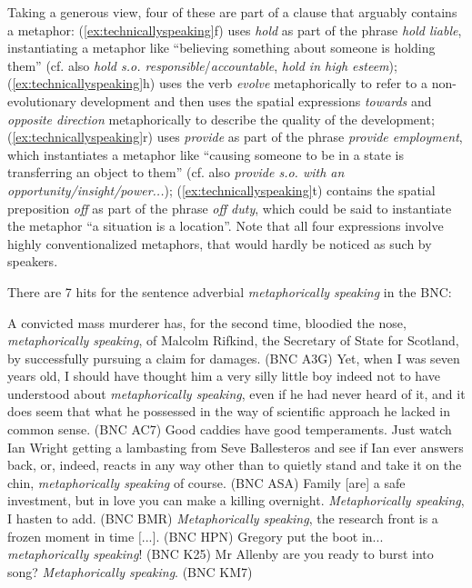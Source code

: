 Taking a generous view, four of these are part of a clause that arguably contains a metaphor:  (\ref{ex:technicallyspeaking}f) uses \textit{hold} as part of the phrase \textit{hold liable}, instantiating a metaphor like ``believing something about someone is holding them'' (cf. also \textit{hold s.o. responsible}\slash \textit{accountable}, \textit{hold in high esteem}); (\ref{ex:technicallyspeaking}h) uses the verb  \textit{evolve} metaphorically to refer to a non\hyp{}evolutionary development and then uses the spatial expressions \textit{towards} and \textit{opposite direction} metaphorically  to describe the quality of the development; (\ref{ex:technicallyspeaking}r) uses \textit{provide} as part of the phrase \textit{provide employment}, which instantiates a metaphor like ``causing someone to be in a state is transferring an object to them'' (cf. also \textit{provide s.o. with an opportunity\slash insight\slash power...}); (\ref{ex:technicallyspeaking}t) contains the spatial preposition  \textit{off} as part of the phrase \textit{off duty}, which could be said to instantiate the metaphor  ``a situation is a location''. Note that all four expressions involve highly conventionalized  metaphors, that would hardly be noticed as such by speakers.

There are 7 hits for the sentence adverbial  \textit{metaphorically speaking} in the  BNC:

\begin{exe}
\ex
\begin{xlist}
\label{ex:metaphoricallyspeaking}
\ex A convicted mass murderer has, for the second time, bloodied the nose, \textit{metaphorically speaking}, of Malcolm Rifkind, the Secretary of State for Scotland, by successfully pursuing a claim for damages. (BNC A3G) %
\ex Yet, when I was seven years old, I should have thought him a very silly little boy indeed not to have understood about \textit{metaphorically speaking}, even if he had never heard of it, and it does seem that what he possessed in the way of scientific approach he lacked in common sense. (BNC AC7) %
\ex Good caddies have good temperaments. Just watch Ian Wright getting a lambasting from Seve Ballesteros and see if Ian ever answers back, or, indeed, reacts in any way other than to quietly stand and take it on the chin, \textit{metaphorically speaking} of course. (BNC ASA) %
\ex Family [are] a safe investment, but in love you can make a killing overnight. \textit{Metaphorically speaking}, I hasten to add. (BNC BMR) %
\ex \textit{Metaphorically speaking}, the research front is a frozen moment in time $[$...$]$. (BNC HPN) %
\ex Gregory put the boot in... \textit{metaphorically speaking}! (BNC K25) %
\ex Mr Allenby are you ready to burst into song? \textit{Metaphorically speaking}. (BNC KM7) %
\end{xlist}
\end{exe}

